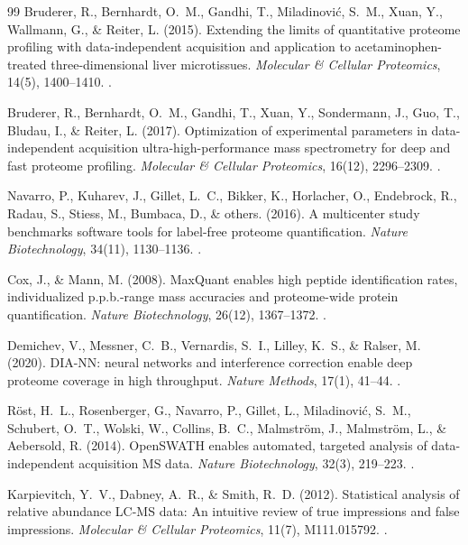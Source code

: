 \documentclass[11pt,twoside,openright]{book}
\begin{document}
\begin{thebibliography}{99}
Bruderer, R., Bernhardt, O.~M., Gandhi, T., Miladinovi{\'c}, S.~M., Xuan, Y., Wallmann, G., \& Reiter, L. (2015). Extending the limits of quantitative proteome profiling with data-independent acquisition and application to acetaminophen-treated three-dimensional liver microtissues. \textit{Molecular \& Cellular Proteomics}, 14(5), 1400--1410. .

Bruderer, R., Bernhardt, O.~M., Gandhi, T., Xuan, Y., Sondermann, J., Guo, T., Bludau, I., \& Reiter, L. (2017). Optimization of experimental parameters in data-independent acquisition ultra-high-performance mass spectrometry for deep and fast proteome profiling. \textit{Molecular \& Cellular Proteomics}, 16(12), 2296--2309. .

Navarro, P., Kuharev, J., Gillet, L.~C., Bikker, K., Horlacher, O., Endebrock, R., Radau, S., Stiess, M., Bumbaca, D., \& others. (2016). A multicenter study benchmarks software tools for label-free proteome quantification. \textit{Nature Biotechnology}, 34(11), 1130--1136. .

Cox, J., \& Mann, M. (2008). MaxQuant enables high peptide identification rates, individualized p.p.b.-range mass accuracies and proteome-wide protein quantification. \textit{Nature Biotechnology}, 26(12), 1367--1372. .

Demichev, V., Messner, C.~B., Vernardis, S.~I., Lilley, K.~S., \& Ralser, M. (2020). DIA-NN: neural networks and interference correction enable deep proteome coverage in high throughput. \textit{Nature Methods}, 17(1), 41--44. .

R{\"o}st, H.~L., Rosenberger, G., Navarro, P., Gillet, L., Miladinovi{\'c}, S.~M., Schubert, O.~T., Wolski, W., Collins, B.~C., Malmstr{\"o}m, J., Malmstr{\"o}m, L., \& Aebersold, R. (2014). OpenSWATH enables automated, targeted analysis of data-independent acquisition MS data. \textit{Nature Biotechnology}, 32(3), 219--223. .

Karpievitch, Y.~V., Dabney, A.~R., \& Smith, R.~D. (2012). Statistical analysis of relative abundance LC-MS data: An intuitive review of true impressions and false impressions. \textit{Molecular \& Cellular Proteomics}, 11(7), M111.015792. .


\end{thebibliography}
\end{document}
